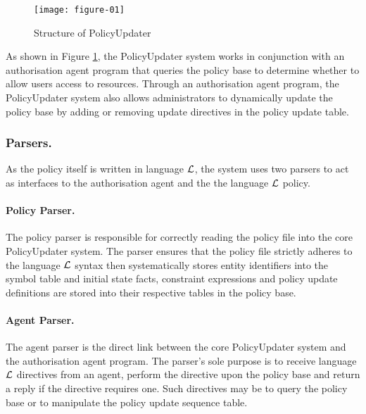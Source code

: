 \documentclass[global,twocolumn,final]{svjour}
\begin{document}
    \begin{figure}[ht]
      \begin{center}
        \texttt{[image: figure-01]}
        \caption{Structure of PolicyUpdater}
        \label{fig-1}
      \end{center}
    \end{figure}

      As shown in Figure \ref{fig-1}, the PolicyUpdater system works in
      conjunction with an authorisation agent program that queries the
      policy base to determine whether to allow users access to resources.
      Through an authorisation agent program, the PolicyUpdater system also
      allows administrators to dynamically update the policy base by adding
      or removing update directives in the policy update table.

      \subsubsection{Parsers.}

        As the policy itself is written in language ${\cal L}$, the system uses
        two parsers to act as interfaces to the authorisation agent and
        the the language ${\cal L}$ policy.

        \paragraph{Policy Parser.}

          The policy parser is responsible for correctly reading the policy
          file into the core PolicyUpdater system. The parser ensures that
          the policy file strictly adheres to the language $\cal{L}$ syntax
          then systematically stores entity identifiers into the symbol table
          and initial state facts, constraint expressions and policy update
          definitions are stored into their respective tables in the policy
          base.

        \paragraph{Agent Parser.}

          The agent parser is the direct link between the core PolicyUpdater
          system and the authorisation agent program. The parser's sole purpose
          is to receive language $\cal{L}$ directives from an agent, perform
          the directive upon the policy base and return a reply if the
          directive requires one. Such directives may be to query the policy
          base or to manipulate the policy update sequence table.
\end{document}
